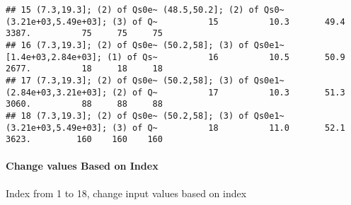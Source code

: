 \documentclass[
]{book}
\newenvironment{Shaded}{\begin{snugshade}}{\end{snugshade}}
\newcommand{\CommentTok}[1]{\textcolor[rgb]{0.56,0.35,0.01}{\textit{#1}}}
\newcommand{\DataTypeTok}[1]{\textcolor[rgb]{0.13,0.29,0.53}{#1}}
\newcommand{\DecValTok}[1]{\textcolor[rgb]{0.00,0.00,0.81}{#1}}
\newcommand{\KeywordTok}[1]{\textcolor[rgb]{0.13,0.29,0.53}{\textbf{#1}}}
\newcommand{\NormalTok}[1]{#1}
\newcommand{\OperatorTok}[1]{\textcolor[rgb]{0.81,0.36,0.00}{\textbf{#1}}}
\newcommand{\OtherTok}[1]{\textcolor[rgb]{0.56,0.35,0.01}{#1}}
\newcommand{\StringTok}[1]{\textcolor[rgb]{0.31,0.60,0.02}{#1}}
\begin{document}
\begin{verbatim}
## 15 (7.3,19.3]; (2) of Qs0e~ (48.5,50.2]; (2) of Qs0~ (3.21e+03,5.49e+03]; (3) of Q~          15          10.3       49.4     3387.          75     75     75
## 16 (7.3,19.3]; (2) of Qs0e~ (50.2,58]; (3) of Qs0e1~ [1.4e+03,2.84e+03]; (1) of Qs~          16          10.5       50.9     2677.          18     18     18
## 17 (7.3,19.3]; (2) of Qs0e~ (50.2,58]; (3) of Qs0e1~ (2.84e+03,3.21e+03]; (2) of Q~          17          10.3       51.3     3060.          88     88     88
## 18 (7.3,19.3]; (2) of Qs0e~ (50.2,58]; (3) of Qs0e1~ (3.21e+03,5.49e+03]; (3) of Q~          18          11.0       52.1     3623.         160    160    160
\end{verbatim}

\hypertarget{change-values-based-on-index}{%
\paragraph{Change values Based on Index}\label{change-values-based-on-index}}

Index from 1 to 18, change input values based on index

\begin{Shaded}
\end{Shaded}
\end{document}

